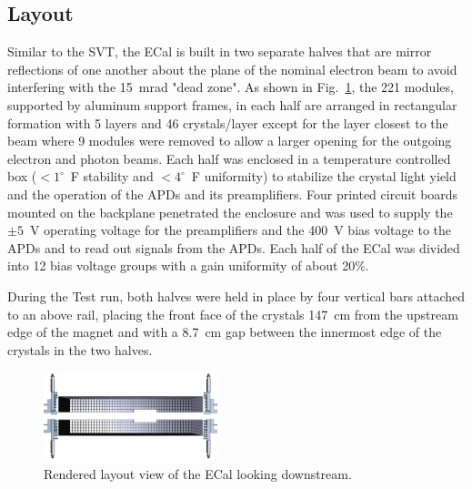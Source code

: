 \documentclass[final,3p,times,twocolumn]{elsarticle}
\begin{document}
\subsection{Layout}
Similar to the SVT, the ECal is built in two separate halves that are mirror reflections of one another 
about the plane of the nominal electron beam to avoid interfering with the 15~mrad "dead zone". 
As shown in Fig.~\ref{fig:ecal}, the 221 modules, supported by aluminum support frames, in each half 
are arranged in rectangular formation with 5 layers and 46 crystals/layer except for the layer closest to 
the beam where 9 modules were removed to allow a larger opening for the outgoing electron and 
photon beams. Each half was enclosed in a temperature controlled box ($<1^{\circ}$~F stability and 
$<4^{\circ}$~F uniformity) to stabilize the crystal light yield and the operation of the APDs and its 
preamplifiers. Four printed circuit boards mounted on the backplane penetrated the enclosure and was 
used to supply the $\pm 5$~V 
operating voltage for the preamplifiers and the 400~V bias voltage to the APDs and to read out signals 
from the APDs. Each half of the ECal was divided into 12 bias voltage groups with a gain uniformity 
of about 20\%. 

During the Test run, both halves were held in place by four vertical bars attached to an above rail, 
placing the front face of the crystals 147~cm from the upstream edge of the magnet and with a 
8.7~cm gap between the innermost edge of the crystals in the two halves.
{\small
\begin{figure}[]
\begin{center}
\includegraphics[width=0.45\textwidth]{figures/ECal}
\caption{Rendered layout view of the ECal looking downstream.}
\label{fig:ecal}
\end{center}
\end{figure}
}
\end{document}
